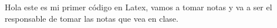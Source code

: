 \documentclass{articule}
\begin{document}
Hola este es mi primer código en Latex, vamos a tomar notas y va a
ser el responsable de tomar las notas que vea en clase.
\end{document}
